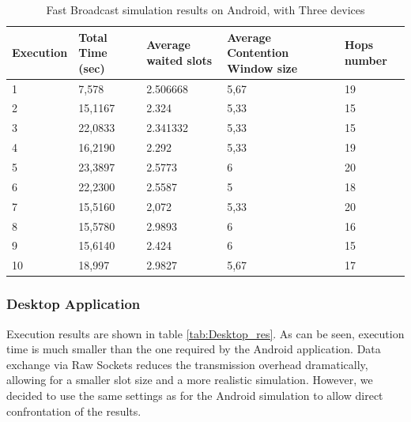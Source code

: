 \begin{table}
\caption{Fast Broadcast simulation results on Android, with Three devices}
\label{tab:Android_res}
\centering
\begin{tabular}{|m{}|m{}|m{}|m{}|m{}|}
\hline
Execution & Total \newline Time (sec) & Average waited slots & Average Contention Window size & Hops \newline number \\
\hline
1 & 7,578		& 2.506668 	& 5,67 & 19 \\
\hline
2 & 15,1167 	& 2.324	  	& 5,33 & 15 \\ %
\hline
3 & 22,0833 	& 2.341332 	& 5,33 & 15 \\  
\hline
4 & 16,2190 	& 2.292	  	& 5,33 & 19 \\ %
\hline
5 & 23,3897		& 2.5773 & 	6	 & 20 \\ %
\hline
6 & 22,2300 	& 2.5587 	& 5	 & 18 \\ %
\hline
7 & 15,5160 	& 2,072	  	& 5,33 & 20 \\ %
\hline
8 & 15,5780 	& 2.9893 	& 6	 & 16 \\ %
\hline
9 & 15,6140 	& 2.424     & 6	 & 15 \\ %
\hline
10 & 18,997 	& 2.9827 	& 5,67 & 17 \\ %
\hline
\end{tabular}
\end{table}  

\subsubsection{Desktop Application}

Execution results are shown in table \ref{tab:Desktop_res}. As can be seen, execution time is much smaller than the one required by the Android application. Data exchange via Raw Sockets reduces the transmission overhead dramatically, allowing for a smaller slot size and a more realistic simulation. However, we decided to use the same settings as for the Android simulation to allow direct confrontation of the results.


